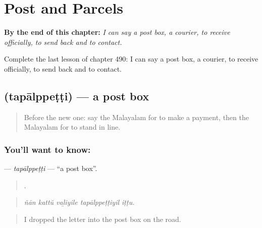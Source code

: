
\chapter{Post and Parcels}
\label{ch:ml-post-and-parcels}

\begin{chapteropening}
\textbf{By the end of this chapter:} \emph{I can say a post box, a courier, to receive officially, to send back and to contact.}

Complete the last lesson of chapter 490: I can say a post box, a courier, to receive officially, to send back and to contact.
\end{chapteropening}

\section[\texorpdfstring{\ml{തപാൽപ്പെട്ടി} (tapālppeṭṭi)}{തപാൽപ്പെട്ടി (tapālppeṭṭi)}]{ (tapālppeṭṭi) — a post box}

\label{lesson:ML-C490-tapalppetti}



\begin{quote}
Before the new one: say the Malayalam for to make a payment, then the Malayalam for to stand in line.
\end{quote}

\subsection*{You'll want to know: }
\textbf{} — \emph{tapālppeṭṭi} — \textquotedblleft{}a post box\textquotedblright{}.

\begin{quote}
    .
\end{quote}

\begin{quote}
\emph{ñān kattŭ vaḻiyile tapālppeṭṭiyil iṭṭu.}
\end{quote}

\begin{quote}
I dropped the letter into the post box on the road.
\end{quote}

